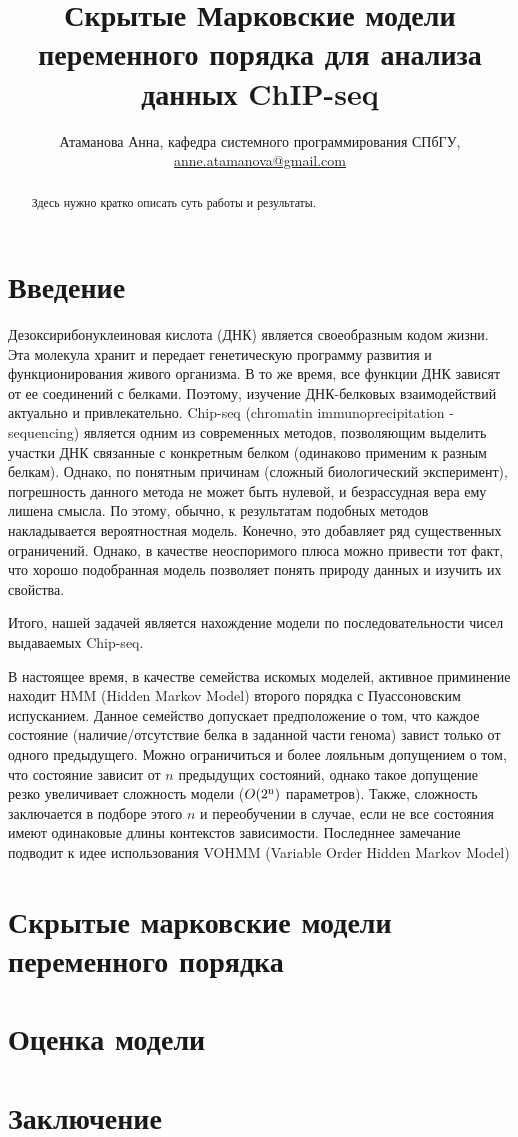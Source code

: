 \documentclass[10pt,a4paper]{article}
\begin{document}
\title{Скрытые Марковские модели переменного порядка для анализа данных
  ChIP-seq}
\author{Атаманова Анна, кафедра системного программирования СПбГУ, \url{anne.atamanova@gmail.com}}

\maketitle

\begin{abstract}
  Здесь нужно кратко описать суть работы и результаты.
\end{abstract}

\section{Введение}

Дезоксирибонуклеиновая кислота (ДНК) является своеобразным кодом жизни. Эта молекула хранит и передает генетическую программу развития и функционирования живого организма.
В то же время, все функции ДНК зависят от ее соединений с белками.
Поэтому, изучение ДНК-белковых взаимодействий актуально и привлекательно.
Chip-seq (chromatin immunoprecipitation - sequencing)\cite{Johnson2007} является одним из современных методов, позволяющим выделить участки ДНК связанные с конкретным белком (одинаково применим к разным белкам).
Однако, по понятным причинам (сложный биологический эксперимент), погрешность данного метода не может быть нулевой, и безрассудная вера ему лишена смысла. По этому, обычно, к результатам подобных методов накладывается вероятностная модель. Конечно, это добавляет ряд существенных ограничений. Однако, в качестве неоспоримого плюса можно привести тот факт, что хорошо подобранная модель позволяет понять природу данных и изучить их свойства.

Итого, нашей задачей является нахождение модели по последовательности чисел выдаваемых Chip-seq.

В настоящее время, в качестве семейства искомых моделей, активное приминение находит HMM (Hidden Markov Model)\cite{Rabiner1989} второго порядка с Пуассоновским испусканием.
Данное семейство допускает предположение о том, что каждое состояние (наличие/отсутствие белка в заданной части генома) завист только от одного предыдущего.
Можно ограничиться и более лояльным допущением о том, что состояние зависит от $n$ предыдущих состояний, однако такое допущение резко увеличивает сложность модели ($O(2\textsuperscript{n})$ параметров). Также, сложность заключается в подборе этого $n$ и переобучении в случае, если не все состояния имеют одинаковые длины контекстов зависимости.
Последннее замечание подводит к идее использования VOHMM (Variable Order Hidden Markov Model)\cite{Wang2006}


\section{Скрытые марковские модели переменного порядка}

\section{Оценка модели}

\section{Заключение}



\end{document}
